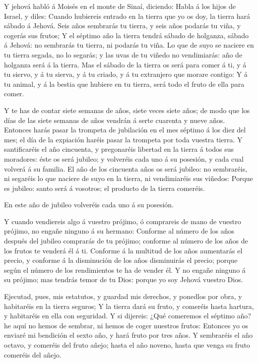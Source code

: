  Y jehová habló á Moisés en el monte de Sinaí, diciendo:
 Habla á los hijos de Israel, y diles: Cuando hubiereis
entrado en la tierra que yo os doy, la tierra hará sábado á Jehová.
 Seis años sembrarás tu tierra, y seis años podarás tu viña,
y cogerás sus frutos;  Y el séptimo año la tierra tendrá
sábado de holganza, sábado á Jehová: no sembrarás tu tierra, ni podarás
tu viña.  Lo que de suyo se naciere en tu tierra segada, no
lo segarás; y las uvas de tu viñedo no vendimiarás: año de holganza será
á la tierra.  Mas el sábado de la tierra os será para comer
á ti, y á tu siervo, y á tu sierva, y á tu criado, y á tu extranjero que
morare contigo:  Y á tu animal, y á la bestia que hubiere en
tu tierra, será todo el fruto de ella para comer.

 Y te has de contar siete semanas de años, siete veces siete
años; de modo que los días de las siete semanas de años vendrán á serte
cuarenta y nueve años.  Entonces harás pasar la trompeta de
jubilación en el mes séptimo á los diez del mes; el día de la expiación
haréis pasar la trompeta por toda vuestra tierra.  Y
santificaréis el año cincuenta, y pregonaréis libertad en la tierra á
todos sus moradores: éste os será jubileo; y volveréis cada uno á su
posesión, y cada cual volverá á su familia.  El año de los
cincuenta años os será jubileo: no sembraréis, ni segaréis lo que
naciere de suyo en la tierra, ni vendimiaréis sus viñedos: 
Porque es jubileo: santo será á vosotros; el producto de la tierra
comeréis.

 En este año de jubileo volveréis cada uno á su posesión.

 Y cuando vendiereis algo á vuestro prójimo, ó comprareis
de mano de vuestro prójimo, no engañe ninguno á su hermano:
 Conforme al número de los años después del jubileo
comprarás de tu prójimo; conforme al número de los años de los frutos te
venderá él á ti.  Conforme á la multitud de los años
aumentarás el precio, y conforme á la disminución de los años
disminuirás el precio; porque según el número de los rendimientos te ha
de vender él.  Y no engañe ninguno á su prójimo; mas
tendrás temor de tu Dios: porque yo soy Jehová vuestro Dios.

 Ejecutad, pues, mis estatutos, y guardad mis derechos, y
ponedlos por obra, y habitaréis en la tierra seguros;  Y la
tierra dará su fruto, y comeréis hasta hartura, y habitaréis en ella con
seguridad.  Y si dijereis: ¿Qué comeremos el séptimo año?
he aquí no hemos de sembrar, ni hemos de coger nuestros frutos:
 Entonces yo os enviaré mi bendición el sexto año, y hará
fruto por tres años.  Y sembraréis el año octavo, y
comeréis del fruto añejo; hasta el año noveno, hasta que venga su fruto
comeréis del añejo.

